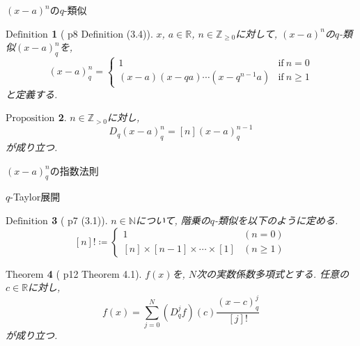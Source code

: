 \documentclass[dvipdfmx,cjk]{beamer}
\theoremstyle{mystyle}
\newtheorem{df}{$\textrm{Definition}$}[section]
\newtheorem{prop}[df]{$\textrm{Proposition}$}
\newtheorem{thm}[df]{$\textrm{Theorem}$}
\newcommand{\N}{\mathbb{N}}
\newcommand{\Z}{\mathbb{Z}}
\newcommand{\R}{\mathbb{R}}
\newcommand{\0}{\textbf{0}}
\begin{document}
\begin{frame}{$(x - a)^n$の$q$-類似} 
	\begin{df}[\cite{Kac} p8 Definition (3.4)]
	  $x$, $a \in \R$, $n \in \Z_{\ge 0}$に対して, $(x - a)^n$の$q$-類似$(x - a)^n_q$を, 
	  \[
	  (x - a)^n_q = \begin{cases}
	                      1 & \text{if}\ n = 0 \\
	                      (x - a) (x - qa) \cdots (x - q^{n - 1} a) & \text{if}\ n \ge 1
	                    \end{cases}
	  \]
	  と定義する. 
	\end{df}
	\begin{prop} \label{Dq_qbinom_nonneg}
	  $n\in\Z_{>0}$に対し, 
	  \[
	    D_q(x-a)^n_q = [n](x-a)^{n-1}_q
	  \]
	  が成り立つ. 
	\end{prop}
\end{frame}

\begin{frame}{$(x - a)^n_q$の指数法則}

\end{frame}

\begin{frame}{$q$-Taylor展開}
	\begin{df}[\cite{Kac} p7 (3.1)]
		$n \in \N$について, 階乗の$q$-類似を以下のように定める. 
    \[
      [n]! \coloneqq \begin{cases}
                            1 & (n=0)\\
                            [n]\times[n-1]\times\cdots\times[1] & (n\ge1)
                          \end{cases}
    \]
  \end{df}
  \begin{thm}[\cite{Kac} p12 Theorem 4.1] \label{q_Taylor}
	 $f(x)$を, $N$次の実数係数多項式とする. 任意の$c\in\R$に対し, 
	 \[
	   f(x) = \sum_{j=0}^N (D_q^jf)(c)\frac{(x-c)^j_q}{[j]!}
	 \]
	 が成り立つ. 
  \end{thm}
\end{frame}
\end{document}
